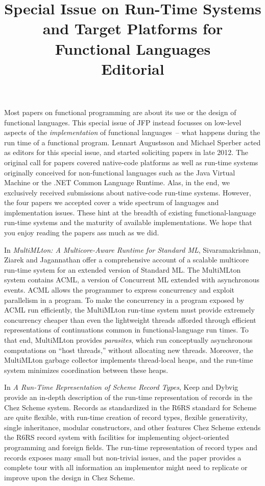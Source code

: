 \documentclass{jfp1}
\title[Special Issue on Run-Time Systems and Target Platforms for Functional Languages]
      {Special Issue on Run-Time Systems and Target Platforms for Functional Languages \\
Editorial}
\begin{document}
\maketitle

\noindent Most papers on functional programming are about its use or the design
of functional languages.  This special issue of JFP instead focusses
on low-level aspects of the \emph{implementation} of functional
languages~-- what happens during the run time of a functional program.
Lennart Augustsson and Michael Sperber acted as editors for this
special issue, and started soliciting papers in late 2012.  The
original call for papers covered native-code platforms as well as
run-time systems originally conceived for non-functional languages
such as the Java Virtual Machine or the .NET Common Language Runtime.
Alas, in the end, we exclusively received submissions about
native-code run-time systems.  However, the four papers we accepted
cover a wide spectrum of languages and implementation issues.  These
hint at the breadth of existing functional-language run-time systems
and the maturity of available implementations.  We hope that you enjoy
reading the papers ass much as we did.

In \textit{MultiMLton: A Multicore-Aware Runtime for Standard ML},
Sivaramakrishnan, Ziarek and Jagannathan offer a comprehensive account
of a scalable multicore run-time system for an extended version of
Standard ML.  The MultiMLton system contains ACML, a version of
Concurrent ML extended with asynchronous events.  ACML allows the
programmer to express concurrency and exploit parallelism in a
program.  To make the concurrency in a program exposed by ACML run
efficiently, the MultiMLton run-time system must provide extremely
concurrency cheaper than even the lightweight threads afforded through
efficient representations of continuations common in
functional-language run times.  To that end, MultiMLton provides
\textit{parasites}, which run conceptually asynchronous computations
on ``host threads,'' without allocating new threads.  Moreover, the
MultiMLton garbage collector implements thread-local heaps, and the
run-time system minimizes coordination between these heaps.

In \textit{A Run-Time Representation of Scheme Record Types}, Keep and
Dybvig provide an in-depth description of the run-time representation
of records in the Chez Scheme system.  Records as standardized in the
R6RS standard for Scheme are quite flexible, with run-time creation of
record types, flexible generativity, single inheritance, modular
constructors, and other features Chez Scheme extends the R6RS record
system with facilities for implementing object-oriented programming
and foreign fields.  The run-time representation of record types and
records exposes many small but non-trivial issues, and the paper
provides a complete tour with all information an implementor might
need to replicate or improve upon the design in Chez Scheme.
\end{document}
